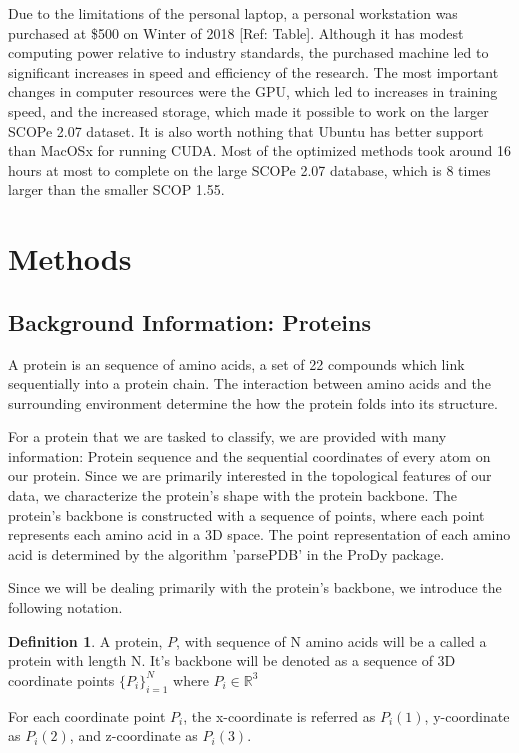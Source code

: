 \documentclass[12pt, a4paper, twocolumn, fullpage]{article}
\theoremstyle{plain}
\theoremstyle{definition}
\newtheorem{defn}{Definition}[section]
\theoremstyle{remark}
\begin{document}
Due to the limitations of the personal laptop, a personal workstation was purchased at \$500 on Winter of 2018 [Ref: Table]. Although it has modest computing power relative to industry standards, the purchased machine led to significant increases in speed and efficiency of the research. The most important changes in computer resources were the GPU, which led to increases in training speed, and the increased storage, which made it possible to work on the larger SCOPe 2.07 dataset. It is also worth nothing that Ubuntu has better support than MacOSx for running CUDA.
Most of the optimized methods took around 16 hours at most to complete on the large SCOPe 2.07 database, which is 8 times larger than the smaller SCOP 1.55. 


\section{Methods}

\subsection{ Background Information: Proteins} \label{Background Information: Proteins}
A protein is an sequence of amino acids, a set of 22 compounds which link sequentially into a protein chain. The interaction between amino acids and the surrounding environment determine the how the protein folds into its structure.

For a protein that we are tasked to classify, we are provided with many information: Protein sequence and the sequential coordinates of every atom on our protein. Since we are primarily interested in the topological features of our data, we characterize the protein's shape with the protein backbone. The protein's backbone is constructed with a sequence of points, where each point represents each amino acid in a 3D space. The point representation of each amino acid is determined by the algorithm 'parsePDB' in the ProDy package. 

Since we will be dealing primarily with the protein's backbone, we introduce the following notation.
    
\begin{defn}
A protein, $P$, with sequence of N amino acids will be a called a protein with length N. It's backbone will be denoted as a sequence of 3D coordinate points $ \{P_i\}^{N}_{i=1} $ where $P_{i} \in \mathbb{R}^3 $

For each coordinate point $ P_{i} $, the x-coordinate is referred as $ P_{i}(1) $, y-coordinate as $ P_{i}(2) $, and z-coordinate as $ P_{i}(3) $.
\end{defn}
\end{document}
